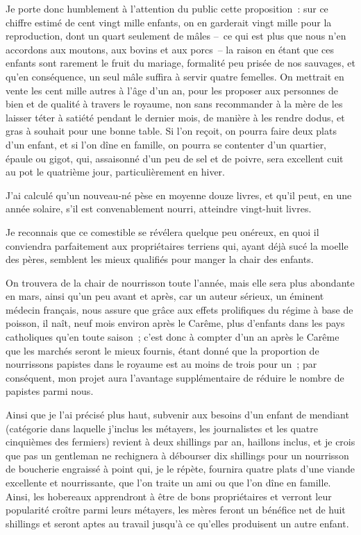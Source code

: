\documentclass[french,twoside]{book} %
\begin{document}
Je porte donc humblement à l’attention du public cette proposition : sur ce chiffre estimé de cent vingt mille enfants, on en garderait vingt mille pour la reproduction, dont un quart seulement de mâles – ce qui est plus que nous n’en accordons aux moutons, aux bovins et aux porcs – la raison en étant que ces enfants sont rarement le fruit du mariage, formalité peu prisée de nos sauvages, et qu’en conséquence, un seul mâle suffira à servir quatre femelles. On mettrait en vente les cent mille autres à l’âge d’un an, pour les proposer aux personnes de bien et de qualité à travers le royaume, non sans recommander à la mère de les laisser téter à satiété pendant le dernier mois, de manière à les rendre dodus, et gras à souhait pour une bonne table. Si l’on reçoit, on pourra faire deux plats d’un enfant, et si l’on dîne en famille, on pourra se contenter d’un quartier, épaule ou gigot, qui, assaisonné d’un peu de sel et de poivre, sera excellent cuit au pot le quatrième jour, particulièrement en hiver.\par
J’ai calculé qu’un nouveau-né pèse en moyenne douze livres, et qu’il peut, en une année solaire, s’il est convenablement nourri, atteindre vingt-huit livres.\par
Je reconnais que ce comestible se révélera quelque peu onéreux, en quoi il conviendra parfaitement aux propriétaires terriens qui, ayant déjà sucé la moelle des pères, semblent les mieux qualifiés pour manger la chair des enfants.\par
On trouvera de la chair de nourrisson toute l’année, mais elle sera plus abondante en mars, ainsi qu’un peu avant et après, car un auteur sérieux, un éminent médecin français, nous assure que grâce aux effets prolifiques du régime à base de poisson, il naît, neuf mois environ après le Carême, plus d’enfants dans les pays catholiques qu’en toute saison ; c’est donc à compter d’un an après le Carême que les marchés seront le mieux fournis, étant donné que la proportion de nourrissons papistes dans le royaume est au moins de trois pour un ; par conséquent, mon projet aura l’avantage supplémentaire de réduire le nombre de papistes parmi nous.\par
Ainsi que je l’ai précisé plus haut, subvenir aux besoins d’un enfant de mendiant (catégorie dans laquelle j’inclus les métayers, les journalistes et les quatre cinquièmes des fermiers) revient à deux shillings par an, haillons inclus, et je crois que pas un gentleman ne rechignera à débourser dix shillings pour un nourrisson de boucherie engraissé à point qui, je le répète, fournira quatre plats d’une viande excellente et nourrissante, que l’on traite un ami ou que l’on dîne en famille. Ainsi, les hobereaux apprendront à être de bons propriétaires et verront leur popularité croître parmi leurs métayers, les mères feront un bénéfice net de huit shillings et seront aptes au travail jusqu’à ce qu’elles produisent un autre enfant.\par
\end{document}
